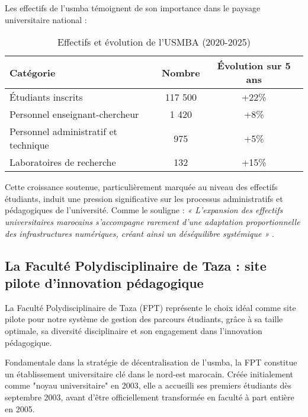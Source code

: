 \documentclass[french,12pt]{report} %
\newcommand{\headercell}[1]{\cellcolor{tableheader}\textbf{#1}}
\newcommand{\rowcol}{\rowcolor{tablerowalt}}
\begin{document}
Les effectifs de l'\gls{usmba} témoignent de son importance dans le paysage universitaire national :

\begin{table}[H]
\begin{mdframed}[style=tablestyle]
\centering
\begin{tabular}{lcc}
\toprule
\headercell{Catégorie} & \headercell{Nombre} & \headercell{Évolution sur 5 ans} \\
\midrule
Étudiants inscrits & 117 500 & +22\% \\
\rowcol
Personnel enseignant-chercheur & 1 420 & +8\% \\
Personnel administratif et technique & 975 & +5\% \\
\rowcol
Laboratoires de recherche & 132 & +15\% \\
\bottomrule
\end{tabular}
\end{mdframed}
\caption{Effectifs et évolution de l'USMBA (2020-2025)}
\label{tab:effectifs}
\end{table}

Cette croissance soutenue, particulièrement marquée au niveau des effectifs étudiants, induit une pression significative sur les processus administratifs et pédagogiques de l'université. Comme le souligne \citeauthor{Moulay2021} : \textit{« L'expansion des effectifs universitaires marocains s'accompagne rarement d'une adaptation proportionnelle des infrastructures numériques, créant ainsi un déséquilibre systémique »} \cite{Moulay2021}.

\subsection{La Faculté Polydisciplinaire de Taza : site pilote d'innovation pédagogique}

\begin{mdframed}[style=figstyle, backgroundcolor=red!5]
La Faculté Polydisciplinaire de Taza (FPT) représente le choix idéal comme site pilote pour notre système de gestion des parcours étudiants, grâce à sa taille optimale, sa diversité disciplinaire et son engagement dans l'innovation pédagogique.
\end{mdframed}

Fondamentale dans la stratégie de décentralisation de l'\gls{usmba}, la FPT constitue un établissement universitaire clé dans le nord-est marocain. Créée initialement comme "noyau universitaire" en 2003, elle a accueilli ses premiers étudiants dès septembre 2003, avant d'être officiellement transformée en faculté à part entière en 2005. 
\end{document}
